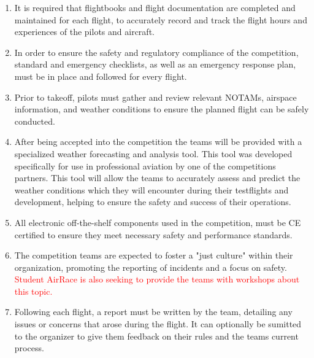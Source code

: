 \documentclass{article}
\begin{document}
\begin{enumerate}
  \item It is required that flightbooks and flight documentation are completed and maintained for each flight, to accurately record and track the flight hours and experiences of the pilots and aircraft.
  \item In order to ensure the safety and regulatory compliance of the competition, standard and emergency checklists, as well as an emergency response plan, must be in place and followed for every flight.
  \item Prior to takeoff, pilots must gather and review relevant NOTAMs, airspace information, and weather conditions to ensure the planned flight can be safely conducted.
  \item After being accepted into the competition the teams will be provided with a specialized weather forecasting and analysis tool. This tool was developed specifically for use in professional aviation by one of the competitions partners. 
  This tool will allow the teams to accurately assess and predict the weather conditions which they will encounter during their testflights and development, helping to ensure the safety and success of their operations. 
  \item All electronic off-the-shelf components used in the competition, must be CE certified to ensure they meet necessary safety and performance standards.
  \item The competition teams are expected to foster a "just culture" within their organization, promoting the reporting of incidents and a focus on safety. \textcolor{red}{Student AirRace is also seeking to provide the teams with workshops about this topic.}
  \item Following each flight, a report must be written by the team, detailing any issues or concerns that arose during the flight. It can optionally be sumitted to the organizer to give them feedback on their rules and the teams current process.
\end{enumerate}
\end{document}
